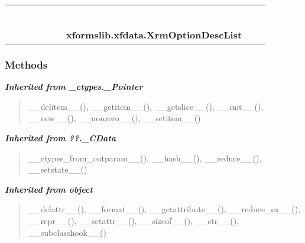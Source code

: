     \label{xformslib:xfdata:XrmOptionDescList}
\begin{tabular}{cccccccccc}
\multicolumn{2}{r}{\settowidth{\BCL}{object}\multirow{2}{\BCL}{object}}
&&
&&
&&
  \\\cline{3-3}
  &&\multicolumn{1}{c|}{}
&&
&&
&&
  \\
\multicolumn{4}{r}{\settowidth{\BCL}{??.\_CData}\multirow{2}{\BCL}{??.\_CData}}
&&
&&
  \\\cline{5-5}
  &&&&\multicolumn{1}{c|}{}
&&
&&
  \\
\multicolumn{6}{r}{\settowidth{\BCL}{\_ctypes.\_Pointer}\multirow{2}{\BCL}{\_ctypes.\_Pointer}}
&&
  \\\cline{7-7}
  &&&&&&\multicolumn{1}{c|}{}
&&
  \\
&&&&&&\multicolumn{2}{l}{\textbf{xformslib.xfdata.XrmOptionDescList}}
\end{tabular}



  \subsubsection{Methods}


\large{\textbf{\textit{Inherited from \_ctypes.\_Pointer}}}

\begin{quote}
\_\_delitem\_\_(), \_\_getitem\_\_(), \_\_getslice\_\_(), \_\_init\_\_(), \_\_new\_\_(), \_\_nonzero\_\_(), \_\_setitem\_\_()
\end{quote}

\large{\textbf{\textit{Inherited from ??.\_CData}}}

\begin{quote}
\_\_ctypes\_from\_outparam\_\_(), \_\_hash\_\_(), \_\_reduce\_\_(), \_\_setstate\_\_()
\end{quote}

\large{\textbf{\textit{Inherited from object}}}

\begin{quote}
\_\_delattr\_\_(), \_\_format\_\_(), \_\_getattribute\_\_(), \_\_reduce\_ex\_\_(), \_\_repr\_\_(), \_\_setattr\_\_(), \_\_sizeof\_\_(), \_\_str\_\_(), \_\_subclasshook\_\_()
\end{quote}

